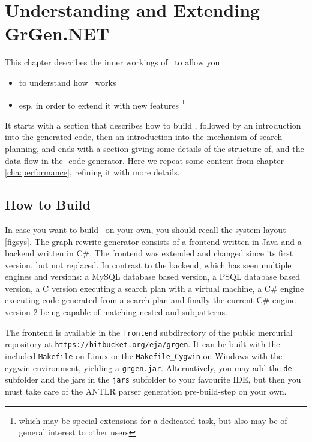 \chapter{Understanding and Extending GrGen.NET} \label{cha:developing}

This chapter describes the inner workings of \GrG~to allow you
\begin{itemize}
\item to understand how \GrG~works
\item esp. in order to extend it with new features
\footnote{which may be special extensions for a dedicated task, but also may be of general interest to other users}
\end{itemize}
It starts with a section that describes how to build \GrG, followed by an introduction into the generated code, then an introduction into the mechanism of search planning, and ends with a section giving some details of the structure of, and the data flow in the \GrG-code generator.
Here we repeat some content from chapter \ref{cha:performance}, refining it with more details.

\section{How to Build}\label{sub:building}

In case you want to build \GrG~on your own, you should recall the system layout \ref{figsys}. 
The graph rewrite generator consists of a frontend written in Java and a backend written in C\#.
The frontend was extended and changed since its first version, but not replaced.
In contrast to the backend, which has seen multiple engines and versions: a MySQL database based version, a PSQL database based version, 
a C version executing a search plan with a virtual machine, a C\# engine executing code generated from a search plan and finally the current C\# engine version 2 being capable of matching nested and subpatterns.

The frontend is available in the \texttt{frontend} subdirectory of the public mercurial repository at \texttt{https://bitbucket.org/eja/grgen}.
It can be built with the included \texttt{Makefile} on Linux or the \texttt{Makefile\_Cygwin} on Windows with the cygwin environment, yielding a \texttt{grgen.jar}. 
Alternatively, you may add the \texttt{de} subfolder and the jars in the \texttt{jars} subfolder to your favourite IDE, but then you must take care of the ANTLR parser generation pre-build-step on your own. 

